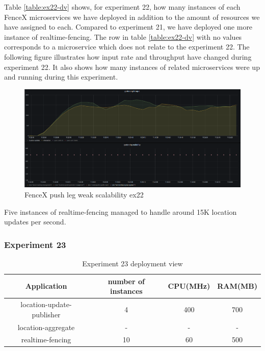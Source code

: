 \documentclass[a4]{report}
\begin{document}
    Table \ref{table:ex22-dv} shows, for experiment 22, how many instances of each FenceX microservices we have
    deployed in addition to the amount of resources we have assigned to each.
    Compared to experiment 21, we have deployed one more instance of realtime-fencing.
    The row in table \ref{table:ex22-dv} with no values corresponds to a microservice which does not relate to the
    experiment 22.
    The following figure illustrates how input rate and throughput have changed during experiment 22.
    It also shows how many instances of related microservices were up and running during this experiment.

    \begin{figure}
        \caption{FenceX push leg weak scalability ex22}
        \label{fig:ex22}
        \includegraphics[scale=0.5]{images/evaluation/ex22-benchmarking-ongoing-1per2sec.png}
    \end{figure}

    \clearpage

    Five instances of realtime-fencing managed to handle around 15K location updates per second.

    \subsubsection{Experiment 23}
    \begin{table}[h!]
        \centering
        \begin{tabular}{|c|c|c|c|}
            \hline
            Application               & number of instances & CPU(MHz) & RAM(MB) \\
            \hline
            location-update-publisher & 4                   & 400      & 700     \\
            location-aggregate        & -                   & -        & -       \\
            realtime-fencing          & 10                  & 60       & 500     \\
            \hline
        \end{tabular}
        \caption{Experiment 23 deployment view}
        \label{table:ex23-dv}
    \end{table}
\end{document}
